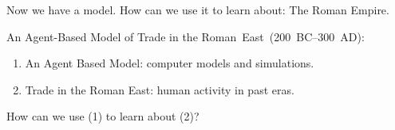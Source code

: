 \documentclass[10pt, notes=show]{beamer}
\begin{document}
\begin{frame}

    Now we have a model. How can we use it to learn about:
    The Roman Empire.

		 \hfill
		 \hfill
        \href{run:../../../../full_projects/icrates_abc/scripts/athens.mpg?onclick&loop}{ } 
\end{frame}
\begin{frame}{}
    An Agent-Based Model of Trade in the Roman~East~(200~BC--300~AD):
    \begin{center}
        \parbox{.6\textwidth}{
            \begin{enumerate}
                \item An Agent Based Model: computer models and simulations.
                \item Trade in the Roman East: human activity in past eras. 
            \end{enumerate}
        }
    \end{center}
    How can we use (\textcolor{tracblue}{1}) to learn about (\textcolor{tracblue}{2})?
    \vfill

\end{frame}
\end{document}
